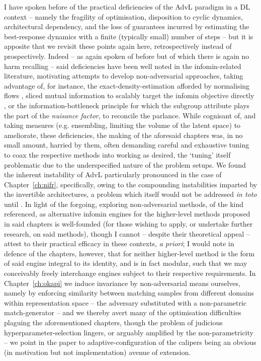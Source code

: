%
I have spoken before of the practical deficiencies of the \ac{AdvL} paradigm in a DL context --
namely the fragility of optimisation, disposition to cyclic dynamics, architectural dependency, and
the loss of guarantees incurred by estimating the best-response dynamics with a finite (typically
small) number of steps -- but it is apposite that we revisit these points again here,
retrospectively instead of prospectively.
%
Indeed -- as again spoken of before but of which there is again no harm recalling -- said
deficiencies have been well noted in the infomin-related literature, motivating attempts to develop
non-adversarial approaches, taking advantage of, for instance, the exact-density-estimation
afforded by normalising flows \citep{balunovic2021fair}, sliced mutual information
\citep{goldfeld2021sliced} to scalably target the infomin objective directly
\citep{chen2022scalable}, or the information-bottleneck principle \citep{tishby2015deep,
moyer2018invariant} for which the subgroup attribute plays the part of the \emph{nuisance factor},
to reconcile the parlance.
%
While cognisant of, and taking measures (e.g. ensembling, limiting the volume of the latent space)
to ameliorate, these deficiencies, the making of the aforesaid chapters was, in no small amount,
harried by them, often demanding careful and exhaustive tuning to coax the respective methods into
working as desired, the `tuning' itself problematic due to the underspecified nature of the problem
setups.
%
We found the inherent instability of \ac{AdvL} particularly pronounced in the case of
Chapter~\ref{ch:nifr}, specifically, owing to the compounding instabilities imparted by the
invertible architectures, a problem which itself would not be addressed \emph{in toto} until
\cite{behrmann2021understanding}.
%
In light of the forgoing, exploring non-adversarial methods, of the kind referenced, as alternative
infomin engines for the higher-level methods proposed in said chapters is well-founded (for those
wishing to apply, or undertake further research, on said methods), though I cannot -- despite their
theoretical appeal -- attest to their practical efficacy in these contexts, \emph{a priori}; I
would note in defence of the chapters, however, that for neither higher-level method is the form of
said engine integral to its identity, and is in fact modular, such that we may conceivably freely
interchange engines subject to their respective requirements.
%
In Chapter~\ref{ch:okapi} we induce invariance by non-adversarial means ourselves, namely by
enforcing similarity between matching samples from different domains within representation space --
the adversary substituted with a non-parametric match-generator -- and we thereby avert many of the
optimisation difficulties plaguing the aforementioned chapters, though the problem of judicious
hyperparameter-selection lingers, or arguably amplified by the non-parametricity -- we point in the
paper to adaptive-configuration of the calipers being an obvious (in motivation but not
implementation) avenue of extension.
%

